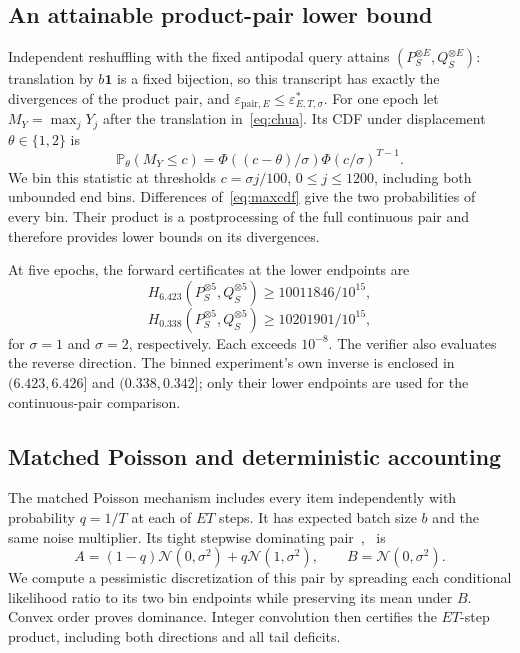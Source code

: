 \documentclass[conference]{IEEEtran}
\newcommand{\N}{\mathcal N}
\newcommand{\Prb}{\mathbb P}
\newcommand{\eps}{\varepsilon}
\newcommand{\pair}{\mathrm{pair}}
\begin{document}
\subsection{An attainable product-pair lower bound}
Independent reshuffling with the fixed antipodal query attains $(P_S^{\otimes E},Q_S^{\otimes E})$: translation by $b\mathbf1$ is a fixed bijection, so this transcript has exactly the divergences of the product pair, and $\eps_{\pair,E}\le\eps^*_{E,T,\sigma}$. For one epoch let $M_Y=\max_jY_j$ after the translation in~\eqref{eq:chua}. Its CDF under displacement $\theta\in\{1,2\}$ is
\begin{equation}\label{eq:maxcdf}
 \Prb_\theta(M_Y\le c)=
 \Phi((c-\theta)/\sigma)\Phi(c/\sigma)^{T-1}.
\end{equation}
We bin this statistic at thresholds $c=\sigma j/100$, $0\le j\le1200$, including both unbounded end bins. Differences of~\eqref{eq:maxcdf} give the two probabilities of every bin. Their product is a postprocessing of the full continuous pair and therefore provides lower bounds on its divergences.

At five epochs, the forward certificates at the lower endpoints are
\[
 H_{6.423}(P_S^{\otimes5},Q_S^{\otimes5})
 \ge10011846/10^{15},
\]
\[
 H_{0.338}(P_S^{\otimes5},Q_S^{\otimes5})
 \ge10201901/10^{15},
\]
for $\sigma=1$ and $\sigma=2$, respectively. Each exceeds $10^{-8}$. The verifier also evaluates the reverse direction. The binned experiment's own inverse is enclosed in $(6.423,6.426]$ and $(0.338,0.342]$; only their lower endpoints are used for the continuous-pair comparison.

\subsection{Matched Poisson and deterministic accounting}
The matched Poisson mechanism includes every item independently with probability $q=1/T$ at each of $ET$ steps. It has expected batch size $b$ and the same noise multiplier. Its tight stepwise dominating pair~\cite{chua2024},~\cite[Thm.~11]{zhu} is
\begin{equation}\label{eq:poisson}
 A=(1-q)\N(0,\sigma^2)+q\N(1,\sigma^2),\qquad
 B=\N(0,\sigma^2).
\end{equation}
We compute a pessimistic discretization of this pair by spreading each conditional likelihood ratio to its two bin endpoints while preserving its mean under $B$. Convex order proves dominance. Integer convolution then certifies the $ET$-step product, including both directions and all tail deficits.
\end{document}
